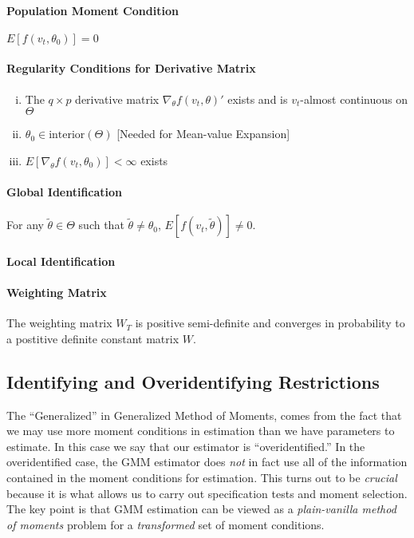 \documentclass[12pt]{article}
\theoremstyle{definition}
\begin{document}
\paragraph{Population Moment Condition} $E[f(v_t, \theta_0)]=0$

\paragraph{Regularity Conditions for Derivative Matrix}
	\begin{enumerate}[(i)]
		\item The $q\times p$ derivative matrix $\nabla_\theta f(v_t, \theta)'$ exists and is $v_t$-almost continuous on $\Theta$
		\item $\theta_0 \in \mbox{interior}(\Theta)$ [Needed for Mean-value Expansion]
		\item $E[\nabla_{\theta}f(v_t, \theta_0)]<\infty$ exists
	\end{enumerate}

\paragraph{Global Identification} For any $\widetilde{\theta}\in \Theta$ such that $\widetilde{\theta}\neq \theta_0$, $E[f(v_t,\widetilde{\theta})]\neq 0 $.

\paragraph{Local Identification}

\paragraph{Weighting Matrix} The weighting matrix $W_T$ is positive semi-definite and converges in probability to a postitive definite constant matrix $W$.


\subsection{Identifying and Overidentifying Restrictions}
The ``Generalized'' in Generalized Method of Moments, comes from the fact that we may use more moment conditions in estimation than we have parameters to estimate. In this case we say that our estimator is ``overidentified.'' In the overidentified case, the GMM estimator does \emph{not} in fact use all of the information contained in the moment conditions for estimation. This turns out to be \emph{crucial} because it is what allows us to carry out specification tests and moment selection. The key point is that GMM estimation can be viewed as a \emph{plain-vanilla method of moments} problem for a \emph{transformed} set of moment conditions.
\end{document}
